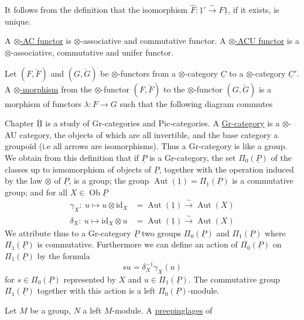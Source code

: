 It follows from the definition that the isomorphism $\hat F:\underline{1}'\xrightarrow{\sim}F\underline{1}$, if it exists, is unique.

A \uline{$\otimes$-AC functor} is  $\otimes$-associative and commutative functor. A \uline{$\otimes$-ACU functor} is a $\otimes$-associative, commutative and unifer functor.

Let $(F,\breve F)$ and $(G,\breve G)$ be $\otimes$-functors from a $\otimes$-category $\underline{C}$ to a $\otimes$-category $\underline{C}'$. A \uline{$\otimes$-morphism} from the $\otimes$-functor $(F,\breve F)$ to the $\otimes$-functor $(G,\breve G)$ is a morphism of functors $\lambda:F\to G$ such that the following diagram commutes

Chapter $\overline{\underline{\mathrm{II}}}$ is a study of Gr-categories and Pic-categories. A \uline{Gr-category} is a $\otimes$-AU category, the objects of which are all invertible, and the base category a groupoïd (i.e all arrows are isomorphisms). Thus a Gr-category is like a group. We obtain from this definition that if $\underline{P}$ is a Gr-category, the set $\Pi_0(\underline{P})$ of the classes up to ismomorphism of objects of $\underline{P}$, together with the operation induced by the law $\otimes$ of $\underline{P}$, is a group; the group $\operatorname{Aut}(\underline{1})=\Pi_1(\underline{P})$ is a commutative group; and for all $X\in\operatorname{Ob}\underline{P}$
\[
\begin{aligned}
\gamma_X:\ u\longmapsto u\otimes\mathrm{id}_X&=\operatorname{Aut}(\underline{1})\xrightarrow{\sim}\operatorname{Aut}(X)\\
\delta_X:\ u\longmapsto\mathrm{id}_X\otimes u&=\operatorname{Aut}(\underline{1})\xrightarrow{\sim}\operatorname{Aut}(X)
\end{aligned}
\]
We attribute thus to a Gr-category $\underline{P}$ two groups $\Pi_0(\underline{P})$ and $\Pi_1(\underline{P})$ where $\Pi_1(\underline{P})$ is commutative. Furthermore we can define an action of $\Pi_0(\underline{P})$ on $\Pi_1(\underline{P})$ by the formula
\[
su=\delta_X^{-1}\gamma_X(u)
\]
for $s\in\Pi_0(\underline{P})$ represented by $X$ and $u\in\Pi_1(\underline{P})$. The commutative group $\Pi_1(\underline{P})$ together with this action is a left $\Pi_0(\underline{P})$-module.

Let $M$ be a group, $N$ a left $M$-module. A \uline{preepinglages} of
